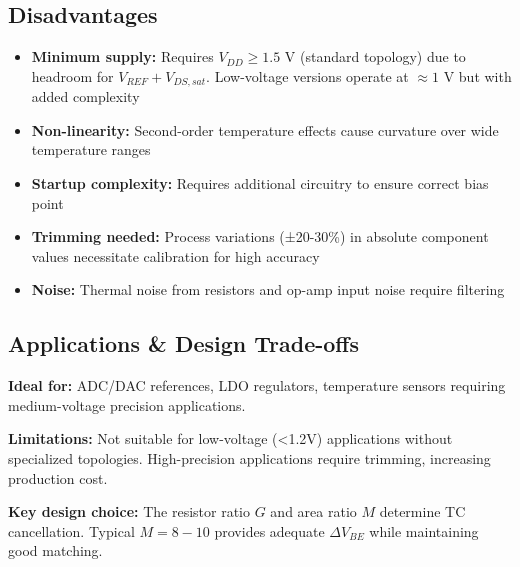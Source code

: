 \documentclass[main.tex]{subfiles}
\begin{document}
\subsection*{Disadvantages}

\begin{itemize}
    \item \textbf{Minimum supply:} Requires $V_{DD} \geq 1.5$ V (standard topology) due to headroom for $V_{REF} + V_{DS,sat}$. Low-voltage versions operate at $\approx 1$ V but with added complexity
    \item \textbf{Non-linearity:} Second-order temperature effects cause curvature over wide temperature ranges
    \item \textbf{Startup complexity:} Requires additional circuitry to ensure correct bias point
    \item \textbf{Trimming needed:} Process variations (±20-30\%) in absolute component values necessitate calibration for high accuracy
    \item \textbf{Noise:} Thermal noise from resistors and op-amp input noise require filtering
\end{itemize}

\subsection*{Applications \& Design Trade-offs}

\textbf{Ideal for:} ADC/DAC references, LDO regulators, temperature sensors requiring medium-voltage precision applications.

\textbf{Limitations:} Not suitable for low-voltage (<1.2V) applications without specialized topologies. High-precision applications require trimming, increasing production cost.

\textbf{Key design choice:} The resistor ratio $G$ and area ratio $M$ determine TC cancellation. Typical $M = 8-10$ provides adequate $\Delta V_{BE}$ while maintaining good matching.
\end{document}
